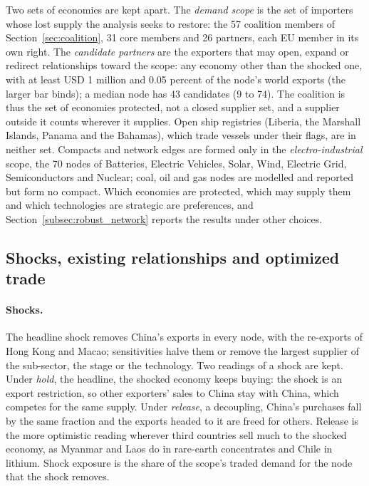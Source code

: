 Two sets of economies are kept apart. The \emph{demand scope} is the set of importers whose lost
supply the analysis seeks to restore: the 57 coalition members of Section~\ref{sec:coalition}, 31 core
members and 26 partners, each EU member in its own right. The \emph{candidate partners} are the
exporters that may open, expand or redirect relationships toward the scope: any economy other than
the shocked one, with at least USD 1 million and 0.05 percent of the node's world exports (the larger
bar binds); a median node has 43 candidates (9 to 74). The coalition is thus the set of economies
protected, not a closed supplier set, and a supplier outside it counts wherever it supplies. Open
ship registries (Liberia, the Marshall Islands, Panama and the Bahamas), which trade vessels under
their flags, are in neither set. Compacts and network edges are formed only in the
\emph{electro-industrial} scope, the 70 nodes of Batteries, Electric Vehicles, Solar, Wind, Electric
Grid, Semiconductors and Nuclear; coal, oil and gas nodes are modelled and reported but form no
compact. Which economies are protected, which may supply them and which technologies are strategic
are preferences, and Section~\ref{subsec:robust_network} reports the results under other choices.

\subsection{Shocks, existing relationships and optimized trade}
\label{subsec:aib_trade}

\paragraph{Shocks.} The headline shock removes China's exports in every node, with the re-exports of
Hong Kong and Macao; sensitivities halve them or remove the largest supplier of the sub-sector, the
stage or the technology. Two readings of a shock are kept. Under \emph{hold}, the headline, the
shocked economy keeps buying: the shock is an export restriction, so other exporters' sales to China
stay with China, which competes for the same supply. Under \emph{release}, a decoupling, China's
purchases fall by the same fraction and the exports headed to it are freed for others. Release is the
more optimistic reading wherever third countries sell much to the shocked economy, as Myanmar and Laos
do in rare-earth concentrates and Chile in lithium. Shock exposure is the share of the scope's traded
demand for the node that the shock removes.

